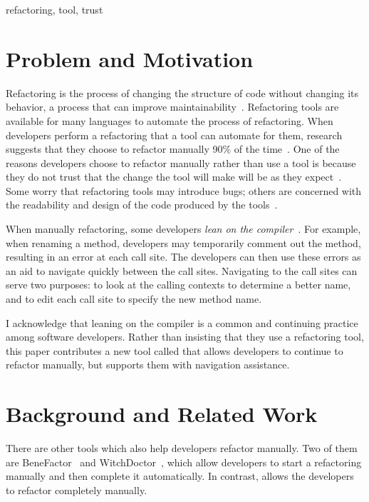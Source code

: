 \documentclass{sigplanconf}
\begin{document}
\keywords
refactoring, tool, trust


\section{Problem and Motivation}
Refactoring is the process of changing the structure of code without changing
its behavior, a process that can improve maintainability~\cite{maintainability}.
Refactoring tools are available for many languages to automate the process of
refactoring. When developers perform a refactoring that a tool can automate for
them, research suggests that they choose to refactor manually 90\% of the
time~\cite{how-refactor}. One of the reasons developers choose to refactor
manually rather than use a tool is because they do not trust that the change
the tool will make will be as they expect~\cite{how-refactor, say-refactor}. 
Some worry that refactoring tools may introduce bugs; others
are concerned with the readability and design of the code produced by the
tools~\cite{say-refactor}.

When manually refactoring, some developers
\textit{lean on the compiler}~\cite{legacy-code, how-refactor}.
For example, when renaming a method, developers may temporarily comment
out the method, resulting
in an error at each call site. The developers can then
use these errors as an aid to navigate quickly between the call sites.
Navigating to the call sites can serve two purposes: to look at the calling
contexts to determine a better name, and to edit each call site to specify
the new method name.

I acknowledge that leaning on the compiler is a common and continuing practice
among software developers. Rather than insisting that they use a refactoring
tool, this paper contributes a new tool
called \pname{} that allows developers to continue to refactor
manually, but supports them with navigation assistance.

\section{Background and Related Work}
There are other tools which also help developers refactor manually. Two of them
are
BeneFactor~\cite{bene-factor} and WitchDoctor~\cite{witch-doctor},
which allow developers to start a refactoring manually and then
complete it automatically.
In contrast, \pname{} allows the developers to refactor completely manually.
\end{document}
